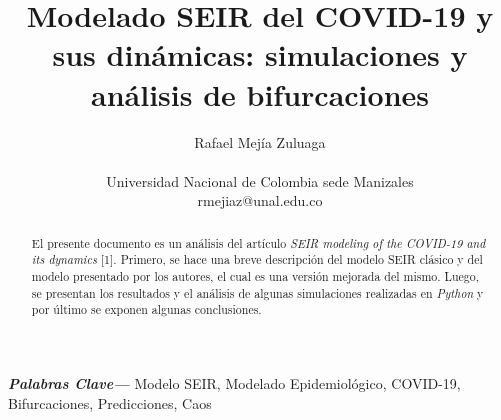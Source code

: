 \documentclass[conference]{IEEEtran}
\providecommand{\keywords}[1]
{
  \small	
  \textbf{\textit{Palabras Clave---}} #1
}
\begin{document}
    

\title{Modelado SEIR del COVID-19 y sus dinámicas: simulaciones y análisis de 
bifurcaciones}

\author{Rafael Mejía Zuluaga \\\\ Universidad Nacional de Colombia sede Manizales \\ rmejiaz@unal.edu.co}

\maketitle


\begin{abstract}
    El presente documento es un análisis del artículo \textit{SEIR modeling of the
    COVID-19 and its dynamics} [1]. Primero, se hace una breve descripción del modelo SEIR 
    clásico y del modelo presentado por los autores, el cual es una versión mejorada del mismo.
    Luego, se presentan los resultados y el análisis de algunas simulaciones realizadas en 
    \textit{Python} y por último se exponen algunas conclusiones.  
    \newline
\end{abstract}

\keywords{Modelo SEIR, Modelado Epidemiológico, COVID-19, Bifurcaciones, Predicciones, Caos}
\end{document}
